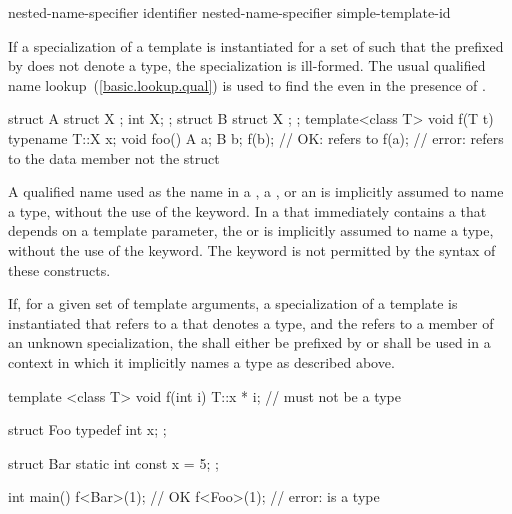 \begin{bnf}
\br
   nested-name-specifier identifier\br
   nested-name-specifier  simple-template-id
\end{bnf}

\pnum
If a specialization of a template is instantiated for a set of
such that the
prefixed by
does not denote a type, the specialization is ill-formed.
The usual qualified name lookup~(\ref{basic.lookup.qual}) is used to find the
even in the presence of
.
\enterexample

\begin{codeblock}
struct A {
  struct X { };
  int X;
};
struct B {
  struct X { };
};
template<class T> void f(T t) {
  typename T::X x;
}
void foo() {
  A a;
  B b;
  f(b);             // OK:  refers to 
  f(a);             // error:  refers to the data member  not the struct 
}
\end{codeblock}
\exitexample

\pnum
A qualified name used as the name in a
,
a
,
or an
is implicitly assumed to name a type, without the use of the
keyword.
In a  that immediately contains a 
that depends on a template parameter, the  or 
is implicitly assumed to name a type, without the use of the  keyword.
\enternote
The
keyword is not permitted by the syntax of these constructs.
\exitnote

\pnum
If, for a given set of template arguments, a specialization of a template is
instantiated that refers to a  that denotes a type,
and the
 refers to a member of an unknown specialization,
the  shall either be
prefixed by  or shall be used in a context in which it
implicitly names a type as described above. \enterexample

\begin{codeblock}
template <class T> void f(int i) {
  T::x * i;         //  must not be a type
}

struct Foo {
  typedef int x;
};

struct Bar {
  static int const x = 5;
};

int main() {
  f<Bar>(1);        // OK
  f<Foo>(1);        // error:  is a type
}
\end{codeblock}
\exitexample


